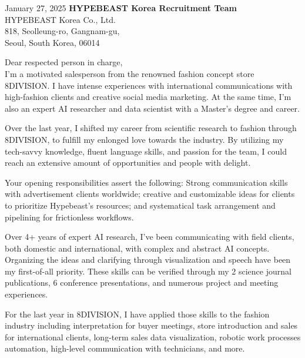 \documentclass[a4paper,10pt]{extarticle}
\begin{document}
\pagestyle{empty}

\pagebreak
\hspace{0pt}
\vfill

\begin{spacing}{1.2}
	\normalsize January 27, 2025 \hfill\large\textbf{HYPEBEAST Korea Recruitment Team}\\
	\normalsize \null\hfill HYPEBEAST Korea Co., Ltd.\\
	\normalsize \null\hfill 818, Seolleung-ro, Gangnam-gu,\\
	\null\hfill Seoul, South Korea, 06014\\
\end{spacing}

Dear respected person in charge,\\

I'm a motivated salesperson from the renowned fashion concept store 8DIVISION. I have intense experiences with international communications with high-fashion clients and creative social media marketing. At the same time, I'm also an expert AI researcher and data scientist with a Master's degree and career.

Over the last year, I shifted my career from scientific research to fashion through 8DIVISION, to fulfill my enlonged love towards the industry. By utilizing my tech-savvy knowledge, fluent language skills, and passion for the team, I could reach an extensive amount of opportunities and people with delight.

Your opening responsibilities assert the following: Strong communication skills with advertisement clients worldwide; creative and customizable ideas for clients to prioritize Hypebeast’s resources; and systematical task arrangement and pipelining for frictionless workflows.

Over 4+ years of expert AI research, I've been communicating with field clients, both domestic and international, with complex and abstract AI concepts. Organizing the ideas and clarifying through visualization and speech have been my first-of-all priority. These skills can be verified through my 2 science journal publications, 6 conference presentations, and numerous project and meeting experiences.

For the last year in 8DIVISION, I have applied those skills to the fashion industry including interpretation for buyer meetings, store introduction and sales for international clients, long-term sales data visualization, robotic work processes automation, high-level communication with technicians, and more.
\end{document}
